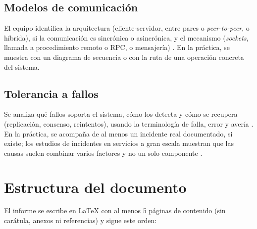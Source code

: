\documentclass[11pt,a4paper]{article}
\begin{document}
\subsection{Modelos de comunicación}

El equipo identifica la arquitectura (cliente-servidor, entre pares o \emph{peer-to-peer}, o híbrida), si la comunicación es sincrónica o asincrónica, y el mecanismo (\emph{sockets}, llamada a procedimiento remoto o RPC, o mensajería) \cite{vansteen2023distributed,aksakalli2021deployment}. En la práctica, se muestra con un diagrama de secuencia o con la ruta de una operación concreta del sistema.

\subsection{Tolerancia a fallos}

Se analiza qué fallos soporta el sistema, cómo los detecta y cómo se recupera (replicación, consenso, reintentos), usando la terminología de falla, error y avería \cite{avizienis2004basic,kleppmann2017designing}. En la práctica, se acompaña de al menos un incidente real documentado, si existe; los estudios de incidentes en servicios a gran escala muestran que las causas suelen combinar varios factores y no un solo componente \cite{ghosh2022fight,huang2022metastable}.

\section{Estructura del documento}\label{sec:estructura}

El informe se escribe en \LaTeX{} con al menos 5 páginas de contenido (sin carátula, anexos ni referencias) y sigue este orden:
\end{document}
